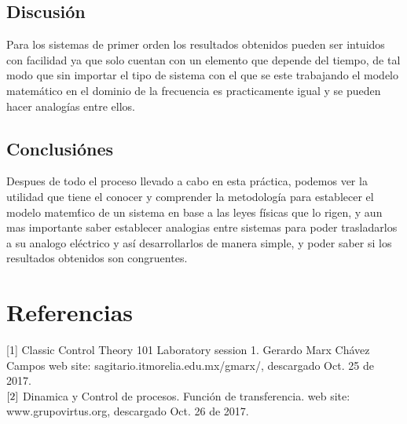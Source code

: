 \documentclass[letterpaper,spanish,12pt]{report}
\begin{document}
\section{Discusi\'on} 
Para los sistemas de primer orden los resultados obtenidos pueden ser intuidos con facilidad ya que solo cuentan con un elemento que depende del tiempo, de tal modo que sin importar el tipo de sistema con el que se este trabajando el modelo matem\'atico en el dominio de la frecuencia es practicamente igual y se pueden hacer analog\'ias entre ellos.
\section{Conclusi\'ones}
Despues de todo el proceso llevado a cabo en esta pr\'actica, podemos ver la utilidad que tiene el conocer y comprender la metodolog\'ia para establecer el modelo matem\'tico de un sistema en base a las leyes f\'isicas que lo rigen, y aun mas importante saber establecer analogias entre sistemas para poder trasladarlos a su analogo el\'ectrico y as\'i desarrollarlos de manera simple, y poder saber si los resultados obtenidos son congruentes.  
\chapter*{Referencias}
[1] Classic Control Theory 101 Laboratory session 1. Gerardo Marx Ch\'avez Campos
web site: sagitario.itmorelia.edu.mx/gmarx/, descargado Oct. 25 de 2017.\medskip\\
$\rm{[2]}$ Dinamica y Control de procesos. Funci\'on de transferencia.
web site: www.grupovirtus.org, descargado Oct. 26 de 2017.
\end{document}
